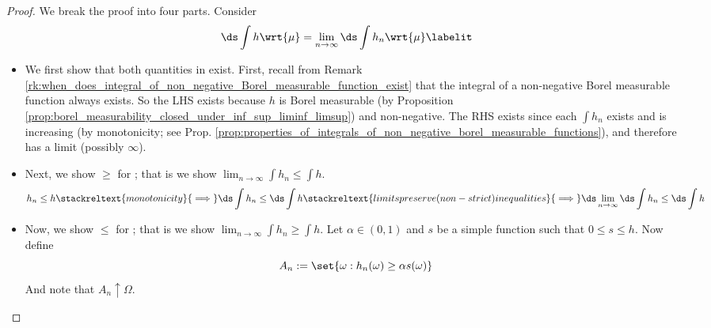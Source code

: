 \documentclass{article} %
\begin{document}
\begin{proof}

We break the proof into four parts.  Consider
\begin{align*}
\ds \int h \wrt{\mu} = \lim_{n \to \infty} \ds\int h_n \wrt{\mu}
\labelit \label{eqn:monotone_convergence_theorem_pre_conclusion}	
\end{align*}

\begin{itemize}
\item We first show that both quantities in  exist. First, recall from Remark \ref{rk:when_does_integral_of_non_negative_Borel_measurable_function_exist} that the integral of a non-negative Borel measurable function always exists. So the LHS exists because $h$ is Borel measurable (by Proposition \ref{prop:borel_measurability_closed_under_inf_sup_liminf_limsup}) and non-negative.  The RHS exists since each $\int h_n$ exists and is increasing (by monotonicity; see Prop. \ref{prop:properties_of_integrals_of_non_negative_borel_measurable_functions}), and therefore has a limit (possibly $\infty$). 

\item Next, we show $\geq$ for ; that is we show $\lim_{n \to \infty} \int h_n \leq \int h$.
\[ h_n \leq h \stackreltext{monotonicity}{\implies} \ds\int h_n \leq \ds\int h \stackreltext{limits preserve (non-strict) inequalities}{\implies} \ds\lim_{n \to \infty} \ds\int h_n \leq \ds\int h \]

\item Now, we show $\leq$ for ; that is we show $\lim_{n \to \infty} \int h_n \geq \int h$.   Let $\alpha \in (0,1)$ and $s$ be a simple function such that $0 \leq s \leq h$.  Now define 
\[ A_n := \set{\omega : h_n(\omega) \geq \alpha s(\omega) }\]
And note that $A_n \uparrow \Omega$.


\end{itemize}
\end{proof}
\end{document}
